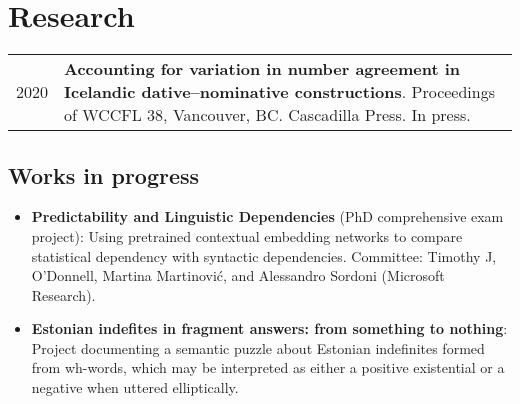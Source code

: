 \documentclass[11pt,a4paper]{article}
\begin{document}
\section{Research} 
\begin{longtable}{p{2cm}|p{14.5cm}}
\textsc{2020}&\textbf{Accounting for variation in number agreement in Icelandic dative--nominative constructions}.  Proceedings of WCCFL 38, Vancouver, BC. Cascadilla Press. In press.\\
\end{longtable}

\subsection{Works in progress}
\begin{itemize}
\item \textbf{Predictability and Linguistic Dependencies} (PhD comprehensive exam project): Using pretrained contextual embedding networks to compare statistical dependency with syntactic dependencies. Committee: Timothy J, O'Donnell, Martina Martinović, and Alessandro Sordoni (Microsoft Research).
\item \textbf{Estonian indefites in fragment answers: from something to nothing}: Project documenting a semantic puzzle about Estonian indefinites formed from wh-words, which may be interpreted as either a positive existential or a negative when uttered elliptically.
\end{itemize}



\end{document}

